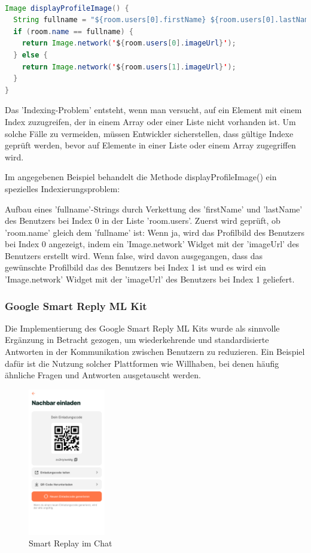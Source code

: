 \begin{lstlisting}[language=Java,caption=Anzeige des Profilbildes,label=lst:fotoSelektion]  

Image displayProfileImage() {
  String fullname = "${room.users[0].firstName} ${room.users[0].lastName}";
  if (room.name == fullname) {
    return Image.network('${room.users[0].imageUrl}');
  } else {
    return Image.network('${room.users[1].imageUrl}');
  }
}

\end{lstlisting}

Das 'Indexing-Problem' entsteht, wenn man versucht, auf ein Element mit einem Index zuzugreifen, der in einem Array oder einer Liste nicht vorhanden ist. Um solche Fälle zu vermeiden, müssen Entwickler sicherstellen, dass gültige Indexe geprüft werden, bevor auf Elemente in einer Liste oder einem Array zugegriffen wird.

Im angegebenen Beispiel behandelt die Methode displayProfileImage() ein spezielles Indexierungsproblem:

Aufbau eines 'fullname'-Strings durch Verkettung des 'firstName' und 'lastName' des Benutzers bei Index 0 in der Liste 'room.users'.
Zuerst wird geprüft, ob 'room.name' gleich dem 'fullname' ist:
Wenn ja, wird das Profilbild des Benutzers bei Index 0 angezeigt, indem ein 'Image.network' Widget mit der 'imageUrl' des Benutzers erstellt wird.
Wenn false, wird davon ausgegangen, dass das gewünschte Profilbild das des Benutzers bei Index 1 ist und es wird ein 'Image.network' Widget mit der 'imageUrl' des Benutzers bei Index 1 geliefert.


\subsubsection{Google Smart Reply ML Kit}
Die Implementierung des Google Smart Reply ML Kits wurde als sinnvolle Ergänzung in Betracht gezogen, um wiederkehrende und standardisierte Antworten in der Kommunikation zwischen Benutzern zu reduzieren. Ein Beispiel dafür ist die Nutzung solcher Plattformen wie Willhaben, bei denen häufig ähnliche Fragen und Antworten ausgetauscht werden.

\begin{figure}[H]
  \centering
  \includegraphics[width=0.3\textwidth]{pics/einladecode-page.png}
  \caption{Smart Replay im Chat}
  \label{fig:einladecode}
\end{figure}

